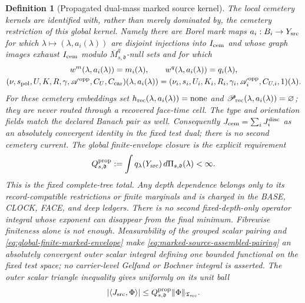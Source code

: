 \documentclass[11pt]{article}
\newtheorem{definition}[theorem]{Definition}
\begin{document}
\begin{definition}[Propagated dual-mass marked source kernel]
The local cemetery kernels are identified with, rather than merely
dominated by, the cemetery restriction of this global kernel.  Namely there
are Borel mark maps $a_i:B_i\to Y_{\rm src}$ for which
$\lambda\mapsto(\lambda,a_i(\lambda))$ are disjoint injections into
$I_{\rm cem}$ and whose graph images exhaust $I_{\rm cem}$ modulo
$\overline M_{s,\mathfrak d}^{q}$-null sets and for which
\begin{equation}
\label{eq:cemetery-global-kernel-identification}
\begin{gathered}
 w^m(\lambda,a_i(\lambda))=m_i(\lambda),\qquad
 w^q(\lambda,a_i(\lambda))=q_i(\lambda),\\
 (\nu,s_{\rm pol},U,K,R,\gamma,\mathscr A^{\rm opp},C_U,C_{\rm car})
   (\lambda,a_i(\lambda))
 = (\nu_i,s_i,U_i,K_i,R_i,\gamma_i,\mathscr A_i^{\rm opp},C_{U,i},1)(\lambda).
\end{gathered}
\end{equation}
For these cemetery embeddings set
$h_{\rm rec}(\lambda,a_i(\lambda))=\mathrm{none}$ and
$\mathscr P_{\rm rec}(\lambda,a_i(\lambda))=\varnothing$; they are never routed
through a recovered face-time cell.
The type and orientation fields match the declared Banach pair as well.
Consequently $J_{\rm cem}=\sum_iJ_i^{\rm disc}$ as an absolutely convergent
identity in the fixed test dual; there is no second cemetery current.
The global finite-envelope closure is the explicit requirement
\begin{equation}
\label{eq:global-finite-marked-envelope}
 Q_{s,\mathfrak d}^{\rm prop}:=\int q_\lambda(Y_{\rm src})
                  \,d\Pi_{s,\mathfrak d}(\lambda)<\infty.
\end{equation}
This is the fixed complete-tree total.  Any depth dependence belongs only
to its record-compatible restrictions or finite marginals and is charged in
the BASE, CLOCK, FACE, and deep ledgers.  There is no
second fixed-depth-only operator integral whose exponent can disappear from
the final minimum.  Fibrewise finiteness alone is not enough.  Measurability
of the grouped scalar pairing and
\eqref{eq:global-finite-marked-envelope} make
\eqref{eq:marked-source-assembled-pairing} an absolutely convergent outer
scalar integral defining one bounded functional on the fixed test space;
no carrier-level Gelfand or Bochner integral is asserted.  The outer scalar
triangle inequality gives uniformly on its unit ball
\begin{equation}
\label{eq:source-incidence-TV-bound}
 |\langle J_{\rm src},\Phi\rangle|
 \le Q_{s,\mathfrak d}^{\rm prop}\|\Phi\|_{\mathfrak T_{\rm src}}.
\end{equation}


\end{definition}
\end{document}
